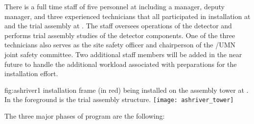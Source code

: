 There is a full time staff of five personnel at 
including a manager, deputy manager, and three experienced technicians
that all participated in  installation at  and
the  trial assembly at .  The staff
oversees operations of the  detector and performs trial
assembly studies of the  detector components.  One of the
three technicians also serves as the site safety officer and
chairperson of the /UMN joint safety committee.  Two additional staff
members will be added in the near future to handle the additional
workload associated with preparations for the 
installation effort.

\begin{dunefigure}
  {fig:ashriver1}
  { installation frame (in red) being installed on the
   assembly tower at . In the foreground is
  the  trial assembly structure.}
   \texttt{[image: ashriver\_tower]}
\end{dunefigure}
The three major phases of  program are the following:
